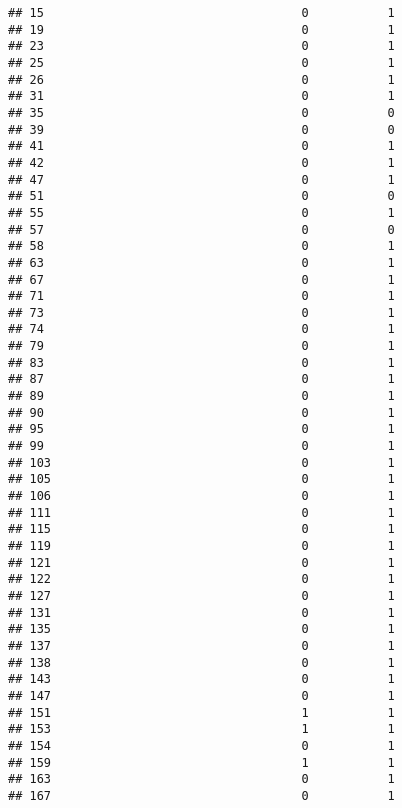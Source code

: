 \documentclass[
]{article}
\begin{document}
\begin{verbatim}
## 15                                    0           1
## 19                                    0           1
## 23                                    0           1
## 25                                    0           1
## 26                                    0           1
## 31                                    0           1
## 35                                    0           0
## 39                                    0           0
## 41                                    0           1
## 42                                    0           1
## 47                                    0           1
## 51                                    0           0
## 55                                    0           1
## 57                                    0           0
## 58                                    0           1
## 63                                    0           1
## 67                                    0           1
## 71                                    0           1
## 73                                    0           1
## 74                                    0           1
## 79                                    0           1
## 83                                    0           1
## 87                                    0           1
## 89                                    0           1
## 90                                    0           1
## 95                                    0           1
## 99                                    0           1
## 103                                   0           1
## 105                                   0           1
## 106                                   0           1
## 111                                   0           1
## 115                                   0           1
## 119                                   0           1
## 121                                   0           1
## 122                                   0           1
## 127                                   0           1
## 131                                   0           1
## 135                                   0           1
## 137                                   0           1
## 138                                   0           1
## 143                                   0           1
## 147                                   0           1
## 151                                   1           1
## 153                                   1           1
## 154                                   0           1
## 159                                   1           1
## 163                                   0           1
## 167                                   0           1

\end{verbatim}
\end{document}

